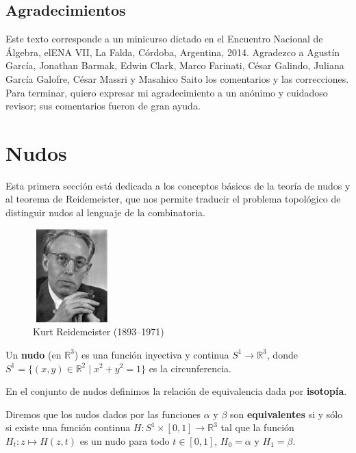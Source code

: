 \documentclass[graybox]{svmult}
\newcommand{\R}{\mathbb{R}}
\begin{document}
\subsection*{Agradecimientos}

Este texto corresponde a un minicurso dictado en el Encuentro Nacional de
Álgebra, elENA VII, La Falda, Córdoba, Argentina, 2014.  Agradezco a Agustín
García, Jonathan Barmak, Edwin Clark, Marco Farinati, César Galindo, Juliana
García Galofre, César Massri y Masahico Saito los comentarios y las
correcciones. Para terminar, quiero expresar mi agradecimiento a un anónimo y
cuidadoso revisor; sus comentarios fueron de gran ayuda. 

\section{Nudos}
\label{section:knots}

Esta primera sección está dedicada a los conceptos básicos de la teoría de
nudos y al teorema de Reidemeister, que nos permite traducir el problema
topológico de distinguir nudos al lenguaje de la combinatoria. 

\begin{figure}[h]
	\centering
    \includegraphics[width=30mm,height=36mm]{images/reidemeister}
    \caption{Kurt Reidemeister (1893--1971)}
\end{figure}

\begin{definition}
    Un \textbf{nudo} (en $\R^3$) es 
	una función inyectiva y continua $S^1\to\R^3$, donde
	$S^1=\{(x,y)\in\R^2\mid x^2+y^2=1\}$ es la circunferencia. 
\end{definition}

En el conjunto de nudos definimos la relación de equivalencia dada por
\textbf{isotopía}. 

\begin{definition}
	Diremos que los nudos dados por las funciones $\alpha$ y $\beta$ son
	\textbf{equivalentes} si y sólo si existe una función continua $H\colon
	S^1\times[0,1]\to\R^3$ tal que la función $H_t\colon z\mapsto H(z,t)$ es un
	nudo para todo $t\in [0,1]$, $H_0=\alpha$ y $H_1=\beta$. 
\end{definition}
\end{document}
